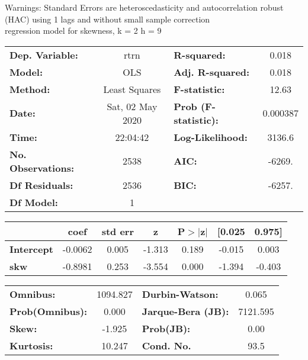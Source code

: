 Warnings: \newline
 [1] Standard Errors are heteroscedasticity and autocorrelation robust (HAC) using 1 lags and without small sample correction\\ 

regression model for skewness, k = 2 h = 9\begin{center}
\begin{tabular}{lclc}
\toprule
\textbf{Dep. Variable:}    &       rtrn       & \textbf{  R-squared:         } &     0.018   \\
\textbf{Model:}            &       OLS        & \textbf{  Adj. R-squared:    } &     0.018   \\
\textbf{Method:}           &  Least Squares   & \textbf{  F-statistic:       } &     12.63   \\
\textbf{Date:}             & Sat, 02 May 2020 & \textbf{  Prob (F-statistic):} &  0.000387   \\
\textbf{Time:}             &     22:04:42     & \textbf{  Log-Likelihood:    } &    3136.6   \\
\textbf{No. Observations:} &        2538      & \textbf{  AIC:               } &    -6269.   \\
\textbf{Df Residuals:}     &        2536      & \textbf{  BIC:               } &    -6257.   \\
\textbf{Df Model:}         &           1      & \textbf{                     } &             \\
\bottomrule
\end{tabular}
\begin{tabular}{lcccccc}
                   & \textbf{coef} & \textbf{std err} & \textbf{z} & \textbf{P$> |$z$|$} & \textbf{[0.025} & \textbf{0.975]}  \\
\midrule
\textbf{Intercept} &      -0.0062  &        0.005     &    -1.313  &         0.189        &       -0.015    &        0.003     \\
\textbf{skw}       &      -0.8981  &        0.253     &    -3.554  &         0.000        &       -1.394    &       -0.403     \\
\bottomrule
\end{tabular}
\begin{tabular}{lclc}
\textbf{Omnibus:}       & 1094.827 & \textbf{  Durbin-Watson:     } &    0.065  \\
\textbf{Prob(Omnibus):} &   0.000  & \textbf{  Jarque-Bera (JB):  } & 7121.595  \\
\textbf{Skew:}          &  -1.925  & \textbf{  Prob(JB):          } &     0.00  \\
\textbf{Kurtosis:}      &  10.247  & \textbf{  Cond. No.          } &     93.5  \\
\bottomrule
\end{tabular}
\end{center}

